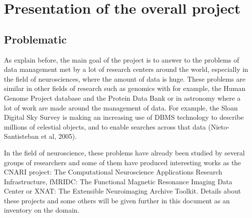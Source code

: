 \section{Presentation of the overall project}
\subsection{Problematic}
\par
As explain before, the main goal of the project is to answer to the problems of data management met by a lot of research centers around the world, especially in the field of neurosciences, where the amount of data is huge. These problems are similar in other fields of research such as genomics with for example, the Human Genome Project database and the Protein Data Bank or in astronomy where a lot of work are made around the management of data. For example, the Sloan Digital Sky Survey is making an increasing use of DBMS technology to describe millions of celestial objects, and to enable searches across that data (Nieto-Santisteban et al, 2005).
\par
In the field of neuroscience, these problems have already been studied by several groups of researchers and some of them have produced interesting works as the CNARI project: The Computational Neuroscience Applications Research Infrastructure, fMRIDC: The Functional Magnetic Resonance Imaging Data Center or XNAT: The Extensible Neuroimaging Archive Toolkit. Details about these projects and some others will be given further in this document as an inventory on the domain.

